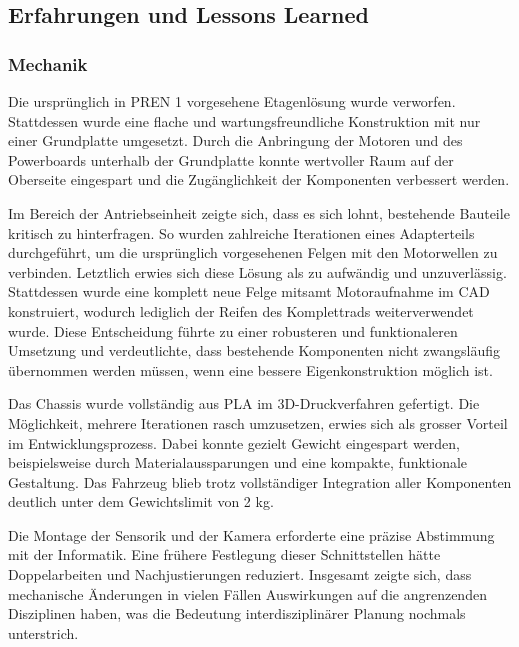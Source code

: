 \documentclass[main.tex]{subfiles} %
\begin{document}
\subsection{Erfahrungen und Lessons Learned}

\subsubsection{Mechanik}
Die ursprünglich in PREN 1 vorgesehene Etagenlösung wurde verworfen.
Stattdessen wurde eine flache und
wartungsfreundliche Konstruktion mit nur einer Grundplatte umgesetzt.
Durch die Anbringung der
Motoren und des Powerboards unterhalb der Grundplatte konnte
wertvoller Raum auf der Oberseite eingespart
und die Zugänglichkeit der Komponenten verbessert werden.

Im Bereich der Antriebseinheit zeigte sich, dass es sich lohnt,
bestehende Bauteile kritisch zu hinterfragen.
So wurden zahlreiche Iterationen eines Adapterteils durchgeführt, um
die ursprünglich vorgesehenen Felgen
mit den Motorwellen zu verbinden. Letztlich erwies sich diese Lösung
als zu aufwändig und unzuverlässig.
Stattdessen wurde eine komplett neue Felge mitsamt Motoraufnahme im
CAD konstruiert, wodurch lediglich
der Reifen des Komplettrads weiterverwendet wurde. Diese Entscheidung
führte zu einer robusteren und
funktionaleren Umsetzung und verdeutlichte, dass bestehende
Komponenten nicht zwangsläufig übernommen werden
müssen, wenn eine bessere Eigenkonstruktion möglich ist.

Das Chassis wurde vollständig aus PLA im 3D-Druckverfahren gefertigt.
Die Möglichkeit, mehrere Iterationen
rasch umzusetzen, erwies sich als grosser Vorteil im
Entwicklungsprozess. Dabei konnte gezielt Gewicht
eingespart werden, beispielsweise durch Materialaussparungen und eine
kompakte, funktionale Gestaltung.
Das Fahrzeug blieb trotz vollständiger Integration aller Komponenten
deutlich unter dem Gewichtslimit von 2 kg.

Die Montage der Sensorik und der Kamera erforderte eine präzise
Abstimmung mit der Informatik. Eine frühere
Festlegung dieser Schnittstellen hätte Doppelarbeiten und
Nachjustierungen reduziert. Insgesamt zeigte sich,
dass mechanische Änderungen in vielen Fällen Auswirkungen auf die
angrenzenden Disziplinen haben, was die
Bedeutung interdisziplinärer Planung nochmals unterstrich.
\end{document}
